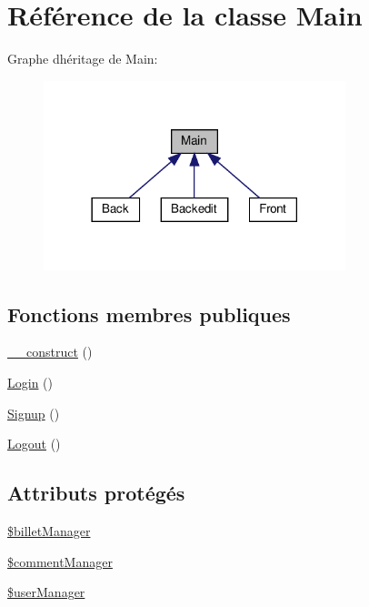 \hypertarget{class_src_1_1_controllers_1_1_main}{}\section{Référence de la classe Main}
\label{class_src_1_1_controllers_1_1_main}


Graphe d\textquotesingle{}héritage de Main\+:
\nopagebreak
\begin{figure}[H]
\begin{center}
\leavevmode
\includegraphics[width=249pt]{d9/dca/class_src_1_1_controllers_1_1_main__inherit__graph}
\end{center}
\end{figure}
\subsection*{Fonctions membres publiques}
\begin{DoxyCompactItemize}
\item 
\hyperlink{class_src_1_1_controllers_1_1_main_a095c5d389db211932136b53f25f39685}{\+\_\+\+\_\+construct} ()
\item 
\hyperlink{class_src_1_1_controllers_1_1_main_a8db48c2902872da0ee80463db6696375}{Login} ()
\item 
\hyperlink{class_src_1_1_controllers_1_1_main_aba348654bb87049dfb96fa24794b191b}{Signup} ()
\item 
\hyperlink{class_src_1_1_controllers_1_1_main_aa14f760d541a59acb41ac8eefddafb9b}{Logout} ()
\end{DoxyCompactItemize}
\subsection*{Attributs protégés}
\begin{DoxyCompactItemize}
\item 
\hyperlink{class_src_1_1_controllers_1_1_main_a7205c4d22c61e375f2be552a32f97ccb}{\$billet\+Manager}
\item 
\hyperlink{class_src_1_1_controllers_1_1_main_a2fdbb2dc79956746757958a453709ca6}{\$comment\+Manager}
\item 
\hyperlink{class_src_1_1_controllers_1_1_main_afd45ca85c50f41c20a03f0a8d0f4db23}{\$user\+Manager}
\end{DoxyCompactItemize}


